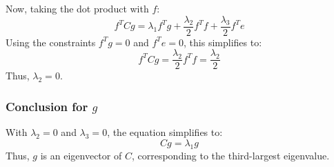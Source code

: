 \documentclass{article}
\begin{document}
Now, taking the dot product with $f$:
\[
f^T C g = {\lambda_1} f^T g + \frac{\lambda_2}{2} f^T f + \frac{\lambda_3}{2} f^T e
\]
Using the constraints $f^T g = 0$ and $f^T e = 0$, this simplifies to:
\[
f^T C g = \frac{\lambda_2}{2} f^T f = \frac{\lambda_2}{2}
\]
Thus, $\lambda_2 = 0$.

\subsubsection*{Conclusion for $g$}

With $\lambda_2 = 0$ and $\lambda_3 = 0$, the equation simplifies to:
\[
C g = {\lambda_1} g
\]
Thus, $g$ is an eigenvector of $C$, corresponding to the third-largest eigenvalue.
\end{document}
